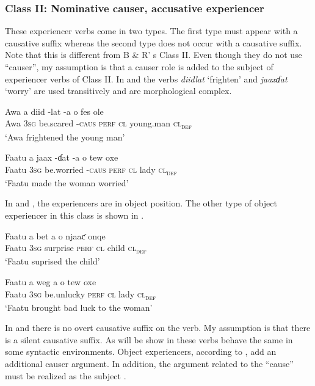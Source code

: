 \documentclass[output=paper]{langscibook}
\begin{document}
\subsubsection{Class II: Nominative causer, accusative experiencer} 

These experiencer verbs come in two types. The first type must appear with a causative suffix whereas the second type does not occur with a causative suffix. Note that this is different from B \& R’ s Class II. Even though they do not use “causer”, my assumption is that a causer role is added to the subject of experiencer verbs of Class II. In  and  the verbs \textit{diidlat} ‘frighten’ and \textit{jaaxɗat} ‘worry’ are used transitively and are morphological complex. 

\ea \label{ex:tamba:5}
\ea \label{ex:tamba:5a}
\gll Awa  a    diid       {}-lat    -a      o     fes              ole\\
    Awa  \textsc{3sg} be.scared -\textsc{caus}   \textsc{perf}  \textsc{cl}    young.man  \textsc{cl\textsubscript{def}}\\
\glt `Awa frightened the young man'

\ex \label{ex:tamba:5b}
\gll Faatu   a       jaax       {}-ɗat    {}-a       o       tew  oxe\\
    Faatu    \textsc{3sg}   be.worried   {}-\textsc{caus}   \textsc{perf}    \textsc{cl}  lady  \textsc{cl\textsubscript{def}}\\
\glt `Faatu made the woman worried'
\z
\z

In  and , the experiencers are in  object position. The other type of object experiencer in this class is shown in .


\ea \label{ex:tamba:6}
\ea \label{ex:tamba:6a}
\gll Faatu   a        bet         a        o  njaaƈ   onqe  \\
    Faatu   \textsc{3sg}    surprise     \textsc{perf}  \textsc{cl} child   \textsc{cl\textsubscript{def}} \\
\glt `Faatu suprised the child'

\ex \label{ex:tamba:6b}
\gll Faatu  a  weg      a  o  tew    oxe\\
    Faatu  3\textsc{sg}  be.unlucky    \textsc{perf}  \textsc{cl}  lady      \textsc{cl\textsubscript{def}}\\
\glt `Faatu brought bad luck to the woman'
\z
\z 

In  and  there is no overt causative suffix on the verb. My assumption is  that there is a silent causative suffix. As will be show in  these verbs behave the same in some syntactic environments. Object experiencers, according to \citet{Pesetsky1995}, add an additional causer argument. In addition, the argument related to the “cause” must be realized as the subject \citep{Grimshaw1990}.
\end{document}
